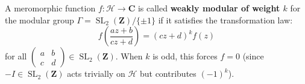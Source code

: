A meromorphic function $f: \mathcal{H} \to \mathbf{C}$ is called \textbf{weakly modular of weight $k$} for the modular group $\Gamma = \operatorname{SL}_2(\mathbf{Z})/\{\pm 1\}$ if it satisfies the transformation law:
$$
f\!\left(\frac{az+b}{cz+d}\right) = (cz+d)^k f(z)
$$
for all $\begin{pmatrix} a & b \\ c & d \end{pmatrix} \in \operatorname{SL}_2(\mathbf{Z})$. When $k$ is odd, this forces $f = 0$ (since $-I \in \operatorname{SL}_2(\mathbf{Z})$ acts trivially on $\mathcal{H}$ but contributes $(-1)^k$).
